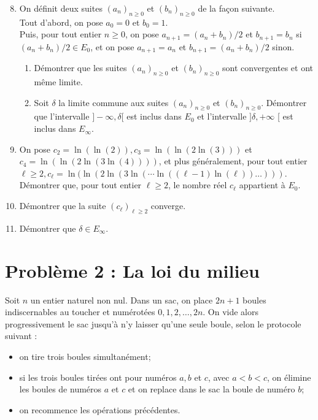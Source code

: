\documentclass[landscape,twocolumn,leqno,a4paper,10pt]{report} %
\newcommand\n{\noindent}
\renewcommand{\geq}{\geqslant}
\begin{document}
\begin{enumerate}\setcounter{enumi}{7}
  	\item On définit deux suites $\left(a_{n}\right)_{n \geq 0}$ et $\left(b_{n}\right)_{n \geq 0}$ de la façon suivante.\\
  	Tout d'abord, on pose $a_{0}=0$ et $b_{0}=1$.\\
  	Puis, pour tout entier $n \geq 0$, on pose $a_{n+1}=\left(a_{n}+b_{n}\right) / 2$ et $b_{n+1}=b_{n}$ si $\left(a_{n}+b_{n}\right) / 2 \in E_{0}$, et on pose $a_{n+1}=a_{n}$ et $b_{n+1}=\left(a_{n}+b_{n}\right) / 2$ sinon.
  	\begin{enumerate}
  		\item Démontrer que les suites $\left(a_{n}\right)_{n \geq 0}$ et $\left(b_{n}\right)_{n \geq 0}$ sont convergentes et ont même limite.
  		\item Soit $\delta$ la limite commune aux suites $\left(a_{n}\right)_{n \geq 0}$ et $\left(b_{n}\right)_{n \geq 0}$. Démontrer que l'intervalle $]-\infty, \delta[$ est inclus dans $E_{0}$ et l'intervalle $] \delta,+\infty$ [ est inclus dans $E_{\infty}$.
  	\end{enumerate}
  	\item On pose $c_{2}=\ln (\ln (2)), c_{3}=\ln (\ln (2 \ln (3)))$ et $c_{4}=\ln (\ln (2 \ln (3 \ln (4))))$, et plus généralement, pour tout entier $\ell \geq 2, c_{\ell}=\ln (\ln (2 \ln (3 \ln (\cdots \ln ((\ell-1) \ln (\ell)) \ldots)))$.\\
  	Démontrer que, pour tout entier $\ell \geq 2$, le nombre réel $c_{\ell}$ appartient à $E_{0}$.
  	\item Démontrer que la suite $\left(c_{\ell}\right)_{\ell \geq 2}$ converge.
  	\item Démontrer que $\delta \in E_{\infty}$.
\end{enumerate}


\section{Problème 2 : La loi du milieu}

\n Soit $n$ un entier naturel non nul. Dans un sac, on place $2 n+1$ boules indiscernables au toucher et numérotées $0,1,2, \ldots, 2 n$. On vide alors progressivement le sac jusqu'à n'y laisser qu'une seule boule, selon le protocole suivant :

\begin{itemize}
  \item on tire trois boules simultanément;
  \item si les trois boules tirées ont pour numéros $a, b$ et $c$, avec $a<b<c$, on élimine les boules de numéros $a$ et $c$ et on replace dans le sac la boule de numéro $b$;
  \item on recommence les opérations précédentes.
\end{itemize}
\end{document}
